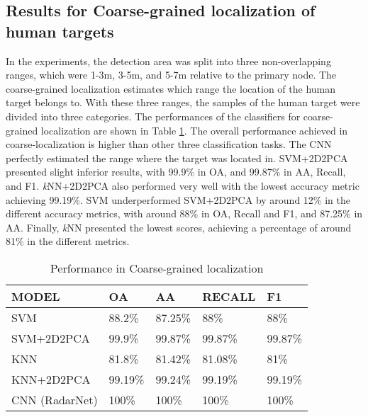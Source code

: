 \subsection{Results for Coarse-grained localization of human targets}
In the experiments, the detection area was split into three non-overlapping ranges, which were 1-3m, 3-5m, and 5-7m relative to the primary node. The coarse-grained localization estimates which range the location of the human target belongs to. With these three ranges, the samples of the human target were divided into three categories. The performances of the classifiers for coarse-grained localization are shown in Table \ref{tb-loc}. The overall performance achieved in coarse-localization is higher than other three classification tasks. The CNN perfectly estimated the range where the target was located in. SVM+2D2PCA presented slight inferior results, with 99.9\% in OA, and 99.87\% in AA, Recall, and F1. \textit{k}NN+2D2PCA also performed very well with the lowest accuracy metric achieving 99.19\%. SVM underperformed SVM+2D2PCA by around 12\% in the different accuracy metrics, with around 88\% in OA, Recall and F1, and 87.25\% in AA. Finally, \textit{k}NN presented the lowest scores, achieving a percentage of around 81\% in the different metrics.
\begin{table}[]
\centering
\caption{Performance in Coarse-grained localization}
\label{tb-loc}
\begin{tabular}{|l|l|l|l|l|}
\hline
\textbf{MODEL} & \textbf{OA} & \textbf{AA} & \textbf{RECALL} & \textbf{F1} \\ \hline
SVM            & 88.2\%      & 87.25\%     & 88\%            & 88\%        \\ \hline
SVM+2D2PCA     & 99.9\%      & 99.87\%     & 99.87\%         & 99.87\%     \\ \hline
KNN            & 81.8\%      & 81.42\%     & 81.08\%         & 81\%        \\ \hline
KNN+2D2PCA     & 99.19\%     & 99.24\%     & 99.19\%         & 99.19\%     \\ \hline
CNN (RadarNet) & 100\%       & 100\%       & 100\%           & 100\%       \\ \hline
\end{tabular}
\end{table}

